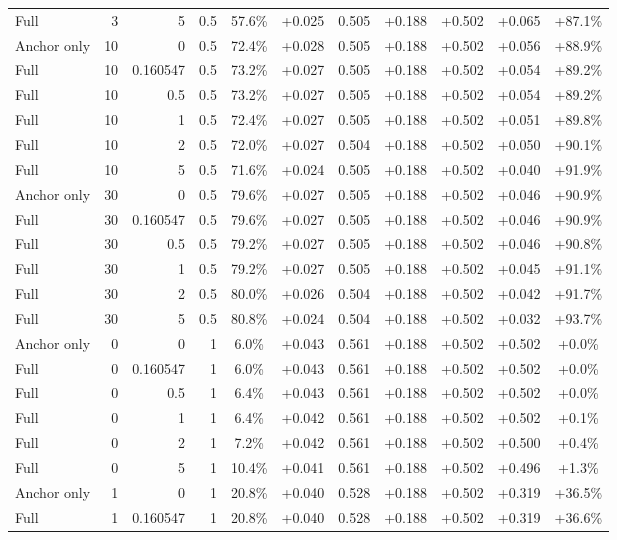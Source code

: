 \begin{table}[htbp]
\begin{tabular}{lrrrccccccc}
Full & 3 & 5 & 0.5 & 57.6\% & +0.025 & 0.505 & +0.188 & +0.502 & +0.065 & +87.1\% \\
Anchor only & 10 & 0 & 0.5 & 72.4\% & +0.028 & 0.505 & +0.188 & +0.502 & +0.056 & +88.9\% \\
Full & 10 & 0.160547 & 0.5 & 73.2\% & +0.027 & 0.505 & +0.188 & +0.502 & +0.054 & +89.2\% \\
Full & 10 & 0.5 & 0.5 & 73.2\% & +0.027 & 0.505 & +0.188 & +0.502 & +0.054 & +89.2\% \\
Full & 10 & 1 & 0.5 & 72.4\% & +0.027 & 0.505 & +0.188 & +0.502 & +0.051 & +89.8\% \\
Full & 10 & 2 & 0.5 & 72.0\% & +0.027 & 0.504 & +0.188 & +0.502 & +0.050 & +90.1\% \\
Full & 10 & 5 & 0.5 & 71.6\% & +0.024 & 0.505 & +0.188 & +0.502 & +0.040 & +91.9\% \\
Anchor only & 30 & 0 & 0.5 & 79.6\% & +0.027 & 0.505 & +0.188 & +0.502 & +0.046 & +90.9\% \\
Full & 30 & 0.160547 & 0.5 & 79.6\% & +0.027 & 0.505 & +0.188 & +0.502 & +0.046 & +90.9\% \\
Full & 30 & 0.5 & 0.5 & 79.2\% & +0.027 & 0.505 & +0.188 & +0.502 & +0.046 & +90.8\% \\
Full & 30 & 1 & 0.5 & 79.2\% & +0.027 & 0.505 & +0.188 & +0.502 & +0.045 & +91.1\% \\
Full & 30 & 2 & 0.5 & 80.0\% & +0.026 & 0.504 & +0.188 & +0.502 & +0.042 & +91.7\% \\
Full & 30 & 5 & 0.5 & 80.8\% & +0.024 & 0.504 & +0.188 & +0.502 & +0.032 & +93.7\% \\
Anchor only & 0 & 0 & 1 & 6.0\% & +0.043 & 0.561 & +0.188 & +0.502 & +0.502 & +0.0\% \\
Full & 0 & 0.160547 & 1 & 6.0\% & +0.043 & 0.561 & +0.188 & +0.502 & +0.502 & +0.0\% \\
Full & 0 & 0.5 & 1 & 6.4\% & +0.043 & 0.561 & +0.188 & +0.502 & +0.502 & +0.0\% \\
Full & 0 & 1 & 1 & 6.4\% & +0.042 & 0.561 & +0.188 & +0.502 & +0.502 & +0.1\% \\
Full & 0 & 2 & 1 & 7.2\% & +0.042 & 0.561 & +0.188 & +0.502 & +0.500 & +0.4\% \\
Full & 0 & 5 & 1 & 10.4\% & +0.041 & 0.561 & +0.188 & +0.502 & +0.496 & +1.3\% \\
Anchor only & 1 & 0 & 1 & 20.8\% & +0.040 & 0.528 & +0.188 & +0.502 & +0.319 & +36.5\% \\
Full & 1 & 0.160547 & 1 & 20.8\% & +0.040 & 0.528 & +0.188 & +0.502 & +0.319 & +36.6\% \\

\end{tabular}
\end{table}
